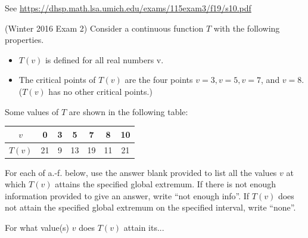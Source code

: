\documentclass[11pt]{exam}
\begin{document}
\begin{questions}
  \begin{solution}
    See \href{https://dhsp.math.lsa.umich.edu/exams/115exam3/f19/s10.pdf}{https://dhsp.math.lsa.umich.edu/exams/115exam3/f19/s10.pdf}
  \end{solution}
\question (Winter 2016 Exam 2) %
  Consider a continuous function \(T\) with the following properties.
  \begin{itemize}
  \item \(T(v)\) is defined for all real numbers v.
  \item The critical points
    of \(T(v)\) are the four points \(v = 3, v = 5, v = 7\), and \(v = 8\). (\(T(v)\)
    has no other critical points.)
  \end{itemize}
  Some values of \(T\) are shown in the following table:\\
  \begin{tabular}{|c|c|c|c|c|c|c|}
    \hline
    \(v\)&0&3&5&7&8&10\\
    \hline
    \(T(v)\)&21&9&13&19&11&21\\
    \hline
  \end{tabular}

  For each of a.-f. below, use the answer blank provided to list all the values \(v\) at which \(T(v)\) attains the specified global extremum. If there is not enough information provided to give an answer, write “not enough info”. If \(T(v)\) does not attain the specified global extremum on the specified interval, write “none”.

  For what value(s) \(v\) does \(T(v)\) attain its... 
\end{questions}
\end{document}
